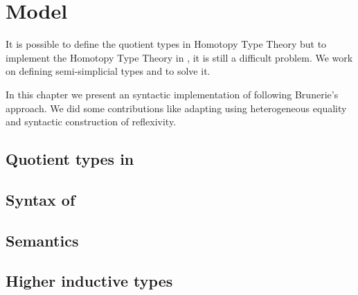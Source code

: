 \chapter{\og Model}
\label{wog}




It is possible to
define the quotient types in Homotopy Type Theory but to implement the
Homotopy Type Theory in \itt{}, it is still a difficult problem. We
work on defining semi-simplicial types and \wog{} to solve it. 



In this chapter we present an syntactic implementation of \wog{} following
Brunerie's approach. We did some contributions like adapting using
heterogeneous equality and syntactic construction of reflexivity.




\section{Quotient types in \hott}


\section{Syntax of \wog}


\section{Semantics}



\section{Higher inductive types}
